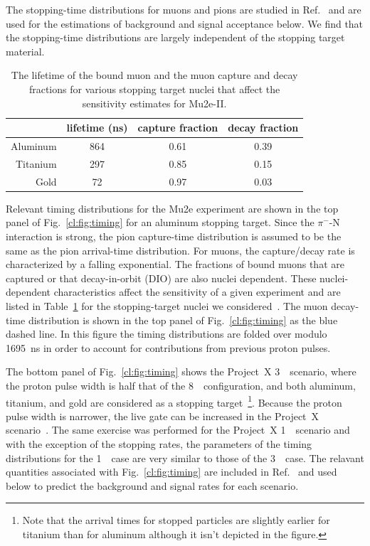 The stopping-time distributions for muons and pions are studied in
Ref.~\cite{Mu2eII} and are used for the estimations of background and
signal acceptance below.  We find that the stopping-time distributions
are largely independent of the stopping target material.
   

\begin{table}[tb]
  \centering
  \begin{tabular}{rccc} \hline\hline
           & lifetime (ns) & capture fraction & decay fraction \\ \hline
  Aluminum & 864           & 0.61            & 0.39 \\
  Titanium & 297           & 0.85            & 0.15 \\ \hline\hline
  Gold     &  72           & 0.97            & 0.03     \\ \hline\hline
  \end{tabular}
  \caption{The lifetime of the bound muon and the muon capture and decay     
    fractions for various stopping target nuclei that affect the 
    sensitivity estimates for Mu2e-II. 
  }
  \label{cl:tab:nucleistuff}
\end{table}
  
Relevant timing distributions for the Mu2e experiment are shown in the
top panel of Fig.~\ref{cl:fig:timing} for an aluminum stopping
target. Since the $\pi^-$-N interaction is strong, the pion
capture-time distribution is assumed to be the same as the pion
arrival-time distribution.  For muons, the capture/decay rate is
characterized by a falling exponential.  The fractions of bound muons
that are captured or that decay-in-orbit (DIO) are also nuclei
dependent.  These nuclei-dependent characteristics affect the
sensitivity of a given experiment and are listed in
Table~\ref{cl:tab:nucleistuff} for the stopping-target nuclei we
considered~\cite{Suzuki:1987jf}.  The muon decay-time distribution is
shown in the top panel of Fig.~\ref{cl:fig:timing} as the blue dashed
line.  In this figure the timing distributions are folded over modulo
1695~ns in order to account for contributions from previous proton
pulses.

The bottom panel of Fig.~\ref{cl:fig:timing} shows the Project~X
3~\gev\ scenario, where the proton pulse width is half that of the
8~\gev\ configuration, and both aluminum, titanium, and gold are
considered as a stopping target~\footnote{Note that the arrival times
for stopped particles are slightly earlier for titanium than for
aluminum although it isn't depicted in the figure.}. Because the proton
pulse width is narrower, the live gate can be increased in the
Project~X scenario~\cite{MoveLiveGate}.  The same exercise was
performed for the Project~X 1~\gev\ scenario and with the exception of
the stopping rates, the parameters of the timing distributions for the
1~\gev\ case are very similar to those of the 3~\gev\ case.  The
relavant quantities associated with Fig.~\ref{cl:fig:timing} are
included in Ref.~\cite{Mu2eII} and used below to predict the
background and signal rates for each scenario.


